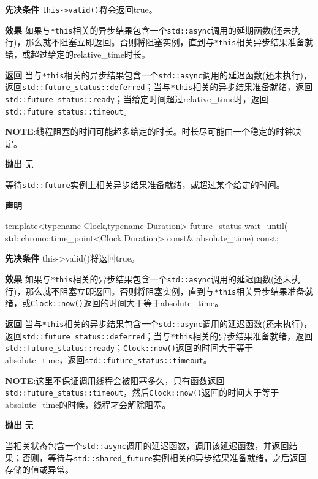 \textbf{先决条件}
\texttt{this->valid()}将会返回true。

\textbf{效果}
如果与\texttt{*this}相关的异步结果包含一个\texttt{std::async}调用的延期函数(还未执行)，那么就不阻塞立即返回。否则将阻塞实例，直到与\texttt{*this}相关异步结果准备就绪，或超过给定的relative\_time时长。

\textbf{返回}
当与\texttt{*this}相关的异步结果包含一个\texttt{std::async}调用的延迟函数(还未执行)，返回\texttt{std::future\_status::deferred}；当与\texttt{*this}相关的异步结果准备就绪，返回\texttt{std::future\_status::ready}；当给定时间超过relative\_time时，返回\texttt{std::future\_status::timeout}。

\textbf{NOTE}:线程阻塞的时间可能超多给定的时长。时长尽可能由一个稳定的时钟决定。

\textbf{抛出}
无


等待\texttt{std::future}实例上相关异步结果准备就绪，或超过某个给定的时间。

\textbf{声明}

\begin{cpp}
template<typename Clock,typename Duration>
future_status wait_until(
  std::chrono::time_point<Clock,Duration> const& absolute_time) const;
\end{cpp}

\textbf{先决条件}
this->valid()将返回true。

\textbf{效果}
如果与\texttt{*this}相关的异步结果包含一个\texttt{std::async}调用的延迟函数(还未执行)，那么就不阻塞立即返回。否则将阻塞实例，直到与\texttt{*this}相关异步结果准备就绪，或\texttt{Clock::now()}返回的时间大于等于absolute\_time。

\textbf{返回}
当与\texttt{*this}相关的异步结果包含一个\texttt{std::async}调用的延迟函数(还未执行)，返回\texttt{std::future\_status::deferred}；当与\texttt{*this}相关的异步结果准备就绪，返回\texttt{std::future\_status::ready}；\texttt{Clock::now()}返回的时间大于等于absolute\_time，返回\texttt{std::future\_status::timeout}。

\textbf{NOTE}:这里不保证调用线程会被阻塞多久，只有函数返回\texttt{std::future\_status::timeout}，然后\texttt{Clock::now()}返回的时间大于等于absolute\_time的时候，线程才会解除阻塞。

\textbf{抛出}
无


当相关状态包含一个\texttt{std::async}调用的延迟函数，调用该延迟函数，并返回结果；否则，等待与\texttt{std::shared\_future}实例相关的异步结果准备就绪，之后返回存储的值或异常。

